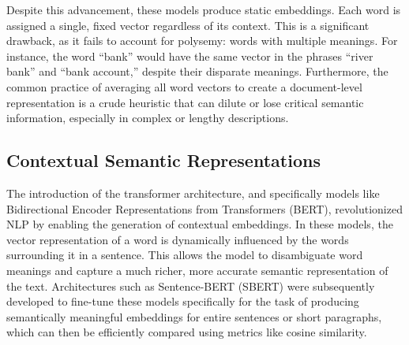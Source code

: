 \begin{introduction}
Despite this advancement, these models produce static embeddings. Each word is assigned a single, fixed vector regardless of its context. This is a significant drawback, as it fails to account for polysemy: words with multiple meanings. For instance, the word ``bank'' would have the same vector in the phrases ``river bank'' and ``bank account,'' despite their disparate meanings. Furthermore, the common practice of averaging all word vectors to create a document-level representation is a crude heuristic that can dilute or lose critical semantic information, especially in complex or lengthy descriptions.

\subsection{Contextual Semantic Representations}
The introduction of the transformer architecture, and specifically models like Bidirectional Encoder Representations from Transformers (BERT), revolutionized NLP by enabling the generation of contextual embeddings. In these models, the vector representation of a word is dynamically influenced by the words surrounding it in a sentence. This allows the model to disambiguate word meanings and capture a much richer, more accurate semantic representation of the text. Architectures such as Sentence-BERT (SBERT) were subsequently developed to fine-tune these models specifically for the task of producing semantically meaningful embeddings for entire sentences or short paragraphs, which can then be efficiently compared using metrics like cosine similarity.

\end{introduction}
